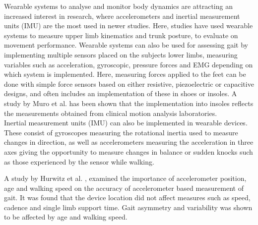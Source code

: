 Wearable systems to analyse and monitor body dynamics are attracting an increased interest in research, where accelerometers and inertial measurement units (IMU) are the most used in newer studies. Here, studies have used wearable systems to measure upper limb kinematics and trunk posture, to evaluate on movement performance. \cite{Wang2017} Wearable systems can also be used for assessing gait by implementing multiple sensors placed on the subjects lower limbs, measuring variables such as acceleration, gyroscopic, pressure forces and EMG depending on which system is implemented. Here, measuring forces applied to the feet can be done with simple force sensors based on either resistive, piezoelectric or capacitive designs, and often includes an implementation of these in shoes or insoles. \cite{Muro2014} A study by Muro et al. \cite{Muro2014} has been shown that the implementation into insoles reflects the measurements obtained from clinical motion analysis laboratories. \\
Inertial measurement units (IMU) can also be implemented in wearable devices. These consist of gyroscopes measuring the rotational inertia used to measure changes in direction, as well as accelerometers measuring the acceleration in three axes giving the opportunity to measure changes in balance or sudden knocks such as those experienced by the sensor while walking. \cite{Muro2014}

A study by Hurwitz et al. \cite{Hurwitz2016}, examined the importance of accelerometer position, age and walking speed on the accuracy of accelerometer based measurement of gait. It was found that the device location did not affect measures such as speed, cadence and single limb support time. Gait asymmetry and variability was shown to be affected by age and walking speed. 




